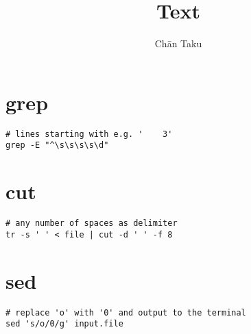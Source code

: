 \documentclass{article}
\title{Text}
\author{Ch\=an Taku}
\begin{document}
\maketitle

\section{grep}

\begin{verbatim}
# lines starting with e.g. '    3'
grep -E "^\s\s\s\s\d"
\end{verbatim}

\section{cut}

\begin{verbatim}
# any number of spaces as delimiter
tr -s ' ' < file | cut -d ' ' -f 8
\end{verbatim}

\section{sed}

\begin{verbatim}
# replace 'o' with '0' and output to the terminal
sed 's/o/0/g' input.file
\end{verbatim}

% 
% 
\end{document}

